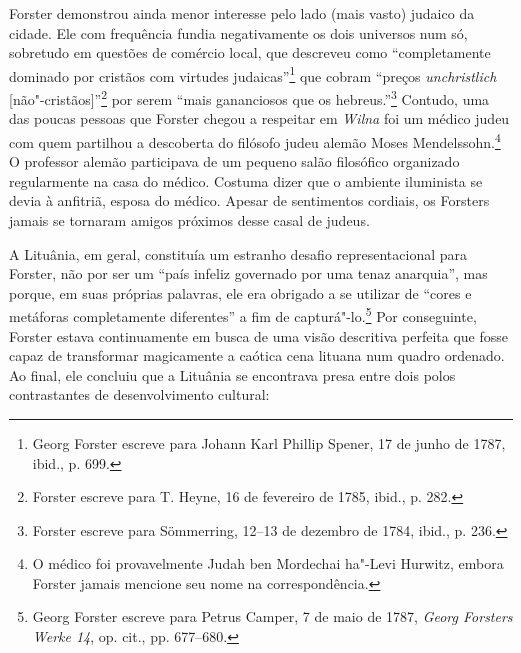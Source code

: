 Forster demonstrou ainda menor interesse pelo lado (mais vasto) judaico
da cidade. Ele com frequência fundia negativamente os dois universos num
só, sobretudo em questões de comércio local, que descreveu como
``completamente dominado por cristãos com virtudes judaicas''\footnote{Georg Forster escreve para Johann Karl Phillip Spener, 17 de junho de 1787, ibid., p. 699.} que cobram ``preços \textit{unchristlich} {[}não"-cristãos{]}''\footnote{Forster escreve para T. Heyne, 16 de fevereiro de 1785, ibid., p. 282.} por serem ``mais gananciosos que os hebreus.''\footnote{Forster escreve para Sömmerring, 12--13 de dezembro de 1784, ibid., p. 236.} Contudo, uma das poucas pessoas que Forster chegou a respeitar em \textit{Wilna} foi um médico judeu com quem partilhou a
descoberta do filósofo judeu alemão Moses Mendelssohn.\footnote{O médico foi provavelmente Judah ben Mordechai ha"-Levi Hurwitz, embora Forster jamais mencione seu nome na correspondência.} O professor alemão participava de um pequeno salão filosófico organizado regularmente na
casa do médico. Costuma dizer que o ambiente iluminista se devia à
anfitriã, esposa do médico. Apesar de sentimentos cordiais, os Forsters
jamais se tornaram amigos próximos desse casal de judeus.

\asterisc

A Lituânia, em geral, constituía um estranho desafio representacional
para Forster, não por ser um ``país infeliz governado por uma tenaz
anarquia'', mas porque, em suas próprias palavras, ele era obrigado a se
utilizar de ``cores e metáforas completamente diferentes'' a fim de
capturá"-lo.\footnote{Georg Forster escreve para Petrus Camper, 7 de maio de 1787, \textit{Georg Forsters Werke 14}, op. cit., pp. 677--680.} Por conseguinte, Forster estava continuamente em busca de uma visão
descritiva perfeita que fosse capaz de transformar magicamente a caótica
cena lituana num quadro ordenado. Ao final, ele concluiu que a Lituânia
se encontrava presa entre dois polos contrastantes de desenvolvimento
cultural:

